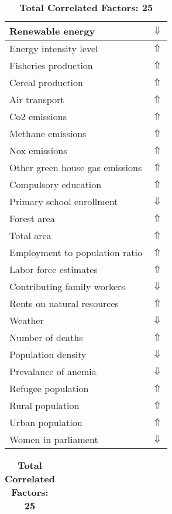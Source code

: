 \documentclass[12pt,notitlepage,oneside]{report}
\begin{document}
\begin{table}[!htb]
\caption{\textbf{Puts At High Risk: Slaughterhouse workers $\Uparrow$}}
\centering
\label{Correlated Socio-economic Factors0}
\begin{tabular}{|l|l|}
\hline
Renewable energy & $\Downarrow$\\ \hline
Energy intensity level & $\Uparrow$\\ \hline
Fisheries production & $\Uparrow$\\ \hline
Cereal production & $\Uparrow$\\ \hline
Air transport  & $\Uparrow$\\ \hline
Co2 emissions & $\Uparrow$\\ \hline
Methane emissions & $\Uparrow$\\ \hline
Nox emissions & $\Uparrow$\\ \hline
Other green house gas emissions & $\Uparrow$\\ \hline
Compulsory education & $\Uparrow$\\ \hline
Primary school enrollment & $\Downarrow$\\ \hline
Forest area & $\Uparrow$\\ \hline
Total area & $\Uparrow$\\ \hline
Employment to population ratio & $\Uparrow$\\ \hline
Labor force estimates & $\Uparrow$\\ \hline
Contributing family workers & $\Downarrow$\\ \hline
Rents on natural resources & $\Uparrow$\\ \hline
Weather & $\Downarrow$\\ \hline
Number of deaths & $\Uparrow$\\ \hline
Population density & $\Downarrow$\\ \hline
Prevalance of anemia & $\Downarrow$\\ \hline
Refugee population & $\Uparrow$\\ \hline
Rural population & $\Uparrow$\\ \hline
Urban population & $\Uparrow$\\ \hline
Women in parliament & $\Downarrow$\\ \hline
\end{tabular}
\begin{tabular}{|l|l|}
\hline
\end{tabular}
\caption*{\textbf{Total Correlated Factors: 25}}
\end{table}
\clearpage
\end{document}
